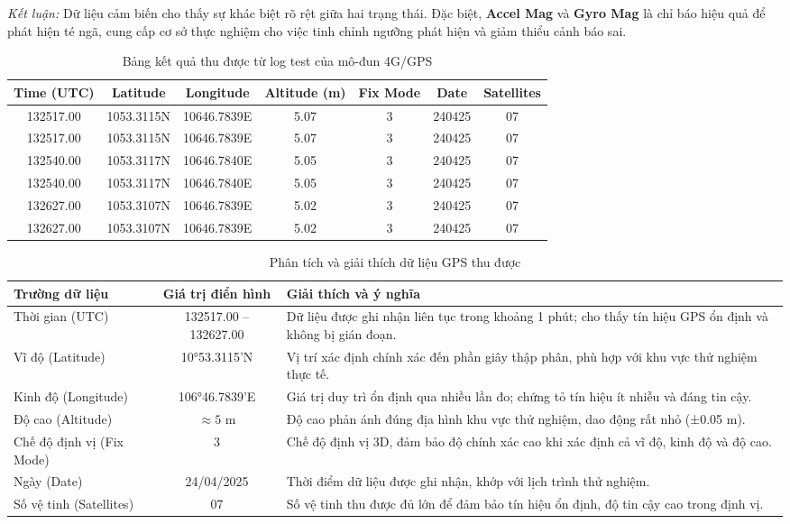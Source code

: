 \textit{Kết luận:} Dữ liệu cảm biến cho thấy sự khác biệt rõ rệt giữa hai trạng thái. Đặc biệt, \textbf{Accel Mag} và \textbf{Gyro Mag} là chỉ báo hiệu quả để phát hiện té ngã, cung cấp cơ sở thực nghiệm cho việc tinh chỉnh ngưỡng phát hiện và giảm thiểu cảnh báo sai.

\begin{table}[H]
\centering
\caption{Bảng kết quả thu được từ log test của mô-đun 4G/GPS}
\label{tab:gps_data}
\begin{tabular}{|c|c|c|c|c|c|c|}
\hline
\textbf{Time (UTC)} & \textbf{Latitude} & \textbf{Longitude} & \textbf{Altitude (m)} & \textbf{Fix Mode} & \textbf{Date} & \textbf{Satellites} \\
\hline
132517.00 & 1053.3115N & 10646.7839E & 5.07 & 3 & 240425 & 07 \\
132517.00 & 1053.3115N & 10646.7839E & 5.07 & 3 & 240425 & 07 \\
132540.00 & 1053.3117N & 10646.7840E & 5.05 & 3 & 240425 & 07 \\
132540.00 & 1053.3117N & 10646.7840E & 5.05 & 3 & 240425 & 07 \\
132627.00 & 1053.3107N & 10646.7839E & 5.02 & 3 & 240425 & 07 \\
132627.00 & 1053.3107N & 10646.7839E & 5.02 & 3 & 240425 & 07 \\
\hline
\end{tabular}
\end{table}

\begin{table}[H]
\centering
\caption{Phân tích và giải thích dữ liệu GPS thu được}
\label{tab:gps_analysis}
\begin{tabular}{|l|c|p{8.5cm}|}
\hline
\textbf{Trường dữ liệu} & \textbf{Giá trị điển hình} & \textbf{Giải thích và ý nghĩa} \\
\hline
Thời gian (UTC) & 132517.00 -- 132627.00 & Dữ liệu được ghi nhận liên tục trong khoảng 1 phút; cho thấy tín hiệu GPS ổn định và không bị gián đoạn. \\
\hline
Vĩ độ (Latitude) & 10°53.3115'N & Vị trí xác định chính xác đến phần giây thập phân, phù hợp với khu vực thử nghiệm thực tế. \\
\hline
Kinh độ (Longitude) & 106°46.7839'E & Giá trị duy trì ổn định qua nhiều lần đo; chứng tỏ tín hiệu ít nhiễu và đáng tin cậy. \\
\hline
Độ cao (Altitude) & $\approx 5$ m & Độ cao phản ánh đúng địa hình khu vực thử nghiệm, dao động rất nhỏ (±0.05 m). \\
\hline
Chế độ định vị (Fix Mode) & 3 & Chế độ định vị 3D, đảm bảo độ chính xác cao khi xác định cả vĩ độ, kinh độ và độ cao. \\
\hline
Ngày (Date) & 24/04/2025 & Thời điểm dữ liệu được ghi nhận, khớp với lịch trình thử nghiệm. \\
\hline
Số vệ tinh (Satellites) & 07 & Số vệ tinh thu được đủ lớn để đảm bảo tín hiệu ổn định, độ tin cậy cao trong định vị. \\
\hline
\end{tabular}
\end{table}

